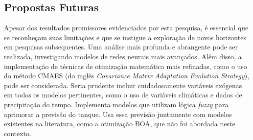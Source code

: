 \subsection{Propostas Futuras}

Apesar dos resultados promissores evidenciados por esta pesquisa, é essencial que se reconheçam suas limitações e que se instigue a exploração de novos horizontes em pesquisas subsequentes. Uma análise mais profunda e abrangente pode ser realizada, investigando modelos de redes neurais mais avançados. Além disso, a implementação de técnicas de otimização matemática mais refinadas, como o uso do método CMAES (do inglês \textit{Covariance Matrix Adaptation Evolution Strategy}), pode ser considerada. Seria prudente incluir cuidadosamente variáveis exógenas em todos os modelos pertinentes, como o uso de variáveis climáticas e dados de precipitação do tempo.
Implementa modelos que utilizam lógica \textit{fuzzy} para aprimorar a previsão do tanque. Usa essa previsão juntamente com modelos existentes na literatura, como a otimização BOA, que não foi abordada neste contexto.


